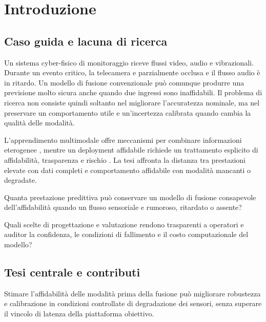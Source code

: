 \chapter{Introduzione}\label{ch:m-introduction}
\section{Caso guida e lacuna di ricerca}
Un sistema cyber-fisico di monitoraggio riceve flussi video, audio e vibrazionali. Durante un evento critico, la telecamera e parzialmente occlusa e il flusso audio è in ritardo. Un modello di fusione convenzionale può comunque produrre una previsione molto sicura anche quando due ingressi sono inaffidabili. Il problema di ricerca non consiste quindi soltanto nel migliorare l'accuratezza nominale, ma nel preservare un comportamento utile e un'incertezza calibrata quando cambia la qualità delle modalità.

L'apprendimento multimodale offre meccanismi per combinare informazioni eterogenee \cite{goodfellow2016deep}, mentre un deployment affidabile richiede un trattamento esplicito di affidabilità, trasparenza e rischio \cite{nist2023airmf}. La tesi affronta la distanza tra prestazioni elevate con dati completi e comportamento affidabile con modalità mancanti o degradate.

\begin{researchquestion}[RQ1 -- Robustezza]
Quanta prestazione predittiva può conservare un modello di fusione consapevole dell'affidabilità quando un flusso sensoriale e rumoroso, ritardato o assente?
\end{researchquestion}

\begin{researchquestion}[RQ2 -- Fiducia]
Quali scelte di progettazione e valutazione rendono trasparenti a operatori e auditor la confidenza, le condizioni di fallimento e il costo computazionale del modello?
\end{researchquestion}

\section{Tesi centrale e contributi}
\begin{resultbox}
Stimare l'affidabilità delle modalità prima della fusione può migliorare robustezza e calibrazione in condizioni controllate di degradazione dei sensori, senza superare il vincolo di latenza della piattaforma obiettivo.
\end{resultbox}

